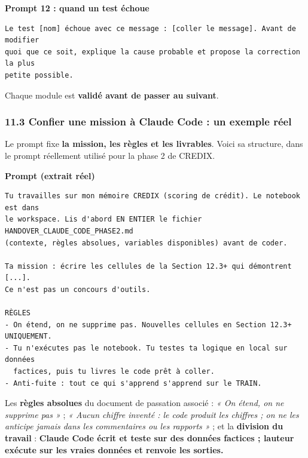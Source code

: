 \documentclass[
  french,
  11pt,
  a4paper,
]{article}
\begin{document}
\textbf{Prompt 12 : quand un test échoue}

\begin{Verbatim}[breaklines=true,breakanywhere=true,fontsize=\small,frame=leftline,framerule=1.6pt,rulecolor=\color{credixblue},framesep=3mm,xleftmargin=2mm,xrightmargin=1mm]
Le test [nom] échoue avec ce message : [coller le message]. Avant de modifier
quoi que ce soit, explique la cause probable et propose la correction la plus
petite possible.
\end{Verbatim}

Chaque module est \textbf{validé avant de passer au suivant}.

\subsubsection{11.3 Confier une mission à Claude Code : un exemple
réel}\label{113-confier-une-mission-uxe0-claude-code--un-exemple-ruxe9el}

Le prompt fixe \textbf{la mission, les règles et les livrables}. Voici
sa structure, dans le prompt réellement utilisé pour la phase 2 de
CREDIX.

\textbf{Prompt (extrait réel)}

\begin{Verbatim}[breaklines=true,breakanywhere=true,fontsize=\small,frame=leftline,framerule=1.6pt,rulecolor=\color{credixblue},framesep=3mm,xleftmargin=2mm,xrightmargin=1mm]
Tu travailles sur mon mémoire CREDIX (scoring de crédit). Le notebook est dans
le workspace. Lis d'abord EN ENTIER le fichier HANDOVER_CLAUDE_CODE_PHASE2.md
(contexte, règles absolues, variables disponibles) avant de coder.

Ta mission : écrire les cellules de la Section 12.3+ qui démontrent [...].
Ce n'est pas un concours d'outils.

RÈGLES
- On étend, on ne supprime pas. Nouvelles cellules en Section 12.3+ UNIQUEMENT.
- Tu n'exécutes pas le notebook. Tu testes ta logique en local sur données
  factices, puis tu livres le code prêt à coller.
- Anti-fuite : tout ce qui s'apprend s'apprend sur le TRAIN.
\end{Verbatim}

Les \textbf{règles absolues} du document de passation associé : \emph{«
On étend, on ne supprime pas »} ; \emph{« Aucun chiffre inventé : le
code produit les chiffres ; on ne les anticipe jamais dans les
commentaires ou les rapports »} ; et la \textbf{division du travail} :
\textbf{Claude Code écrit et teste sur des données factices ;
l\textquotesingle auteur exécute sur les vraies données et renvoie les
sorties.}
\end{document}
